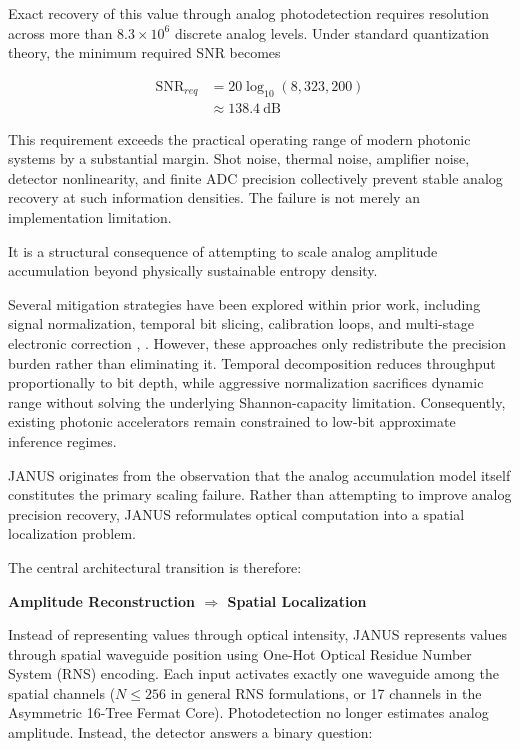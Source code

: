 \documentclass[journal]{IEEEtran}
\begin{document}
Exact recovery of this value through analog photodetection requires resolution across more than $8.3 \times 10^{6}$ discrete analog levels. Under standard quantization theory, the minimum required SNR becomes \cite{Winzer2006,Saleh2019}

\begin{align}
\mathrm{SNR}_{req} &= 20\log_{10}\left( 8{,}323{,}200 \right) \\
&\approx 138.4~\mathrm{dB} \label{eq:snr_requirement}
\end{align}

This requirement exceeds the practical operating range of modern photonic systems by a substantial margin. Shot noise, thermal noise, amplifier noise, detector nonlinearity, and finite ADC precision collectively prevent stable analog recovery at such information densities.
The failure is not merely an implementation limitation.

It is a structural consequence of attempting to scale analog amplitude accumulation beyond physically sustainable entropy density.

Several mitigation strategies have been explored within prior work, including signal normalization, temporal bit slicing, calibration loops, and multi-stage electronic correction \cite{Hamerly2022}, \cite{Cauwenberghs2013}. However, these approaches only redistribute the precision
burden rather than eliminating it. Temporal decomposition reduces throughput proportionally to bit depth, while aggressive normalization sacrifices dynamic range without solving the underlying Shannon-capacity limitation. Consequently, existing photonic accelerators remain constrained to low-bit approximate inference regimes.

JANUS originates from the observation that the analog accumulation model itself constitutes the primary scaling failure. Rather than attempting to improve analog precision recovery, JANUS reformulates optical computation into a spatial localization problem.

The central architectural transition is therefore: 

\begin{center}
\textbf{Amplitude Reconstruction $\Longrightarrow$ Spatial Localization}
\end{center}

Instead of representing values through optical intensity, JANUS represents values through spatial waveguide position using One-Hot Optical Residue Number System (RNS) encoding. Each input activates exactly one waveguide among the spatial channels ($N \le 256$ in general RNS formulations, or 17 channels in the Asymmetric 16-Tree Fermat Core). Photodetection no longer estimates analog amplitude. Instead, the detector answers a binary question:
\end{document}
